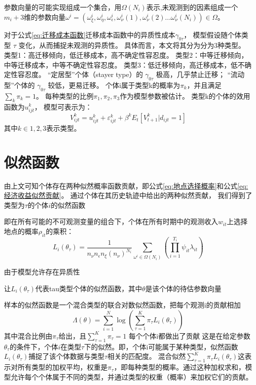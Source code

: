 \documentclass[
  a4paper,
  zihao=-4,
  fontset=mac,
  AutoFakeBold,
  AutoFakeSlant,
  oneside]{ctexbook}
\begin{document}
参数向量的可能实现组成一个集合，用$\Omega(N_{i})$表示,未观测到的因素组成一个$m_{i}+3$维的参数向量$\omega^{i}=(\omega^{i}_{\xi},\omega^{i}_{\eta},\omega^{i}_{\epsilon},\omega^{i}_{\nu}(1),\omega^{i}_{\nu}(2)...\omega^{i}_{\nu}(N_{i}))\in \Omega$。


对于公式\ref{eq:迁移成本函数}迁移成本函数中的异质性成本$\gamma_{0\tau}$，
模型假设随个体类型 $\tau$ 变化，从而捕捉未观测的异质性。
具体而言，本文将其分为分为3种类型。
类型1：高迁移倾向，低迁移成本，高不确定性容忍度。
类型2：中等迁移倾向，中等迁移成本，中等不确定性容忍度。
类型3：低迁移倾向，高迁移成本，低不确定性容忍度。
“定居型”个体（stayer type）的 $\gamma_{0\tau}$ 极高，几乎禁止迁移；
“流动型”个体的 $\gamma_{0\tau}$ 较低，更易迁移。
个体i属于类型k的概率为$\pi_k$，并且满足$\sum\limits_{k}^{} \pi_k = 1$。
每种类型的比例$\pi_1, \pi_2, \pi_3$作为模型参数被估计。
类型k的个体的效用函数为$u_{ijt}^k$，
模型可表示为：
$$V_{ijt}^k = u_{ijt}^k + \varepsilon_{ijt}^k + \beta^k E_t[V_{t+1}^k|d_{ijt}=1]$$
其中$k\in{1,2,3}$表示类型。


\section{似然函数}

由上文可知个体存在两种似然概率函数贡献，即公式\ref{eq:地点选择概率}和公式\ref{eq:经济收益似然贡献}。
通过个体在其历史轨迹中给出的两种似然贡献，
我们得到了类型为$\tau$的个体$i$的似然函数

即在所有可能的不可观测变量的组合下，个体在所有时期中的观测收入$w_{it}$上选择地点的概率$\rho_{it}$的乘积：
\begin{equation}
  L_{i}(\theta_{\tau})=\frac{1}{n_{\nu}n_{\epsilon}n_{\xi}(n_{\nu})^{N_{i}}} \sum\limits_{\omega^{i}\in\Omega(N_{i})}(\prod\limits_{i=1}^{T_{i}} \psi_{it}\lambda_{it})
\end{equation}

由于模型允许存在异质性

让$L_{i}(\theta_{\tau})$代表tau类型个体的似然函数，其中$\theta$是该个体的待估参数向量

样本的似然函数是一个混合类型的联合对数似然函数，把每个观测i的贡献相加
\begin{equation}
\Lambda(\theta)=\sum\limits_{i=1}^{N}\log(\sum\limits_{\tau=1}^{K}\pi_{\tau}L_{i}(\theta_{\tau})) 
\end{equation}
其中混合比例由$\pi_{\tau}$给出，且$\sum\limits_{\tau=1}^{K}\pi_{\tau}=1$
每个个体i都做出了贡献
这是在给定参数$\theta_{\tau}$的条件下，个体$i$在类型$\tau$下的似然。即，个体i可能属于某种类型，似然函数
$L_i(\theta_{\tau})$捕捉了该个体数据与类型$\tau$相关的匹配度。
混合似然$\sum_{\tau=1}^{K} \pi_{\tau} L_i(\theta_{\tau})$这表示对所有类型的加权平均，权重是$\pi_{\tau}$，即每种类型的概率。通过这种加权求和，模型允许每个个体属于不同的类型，并通过类型的权重（概率）来加权它们的贡献。
\end{document}
